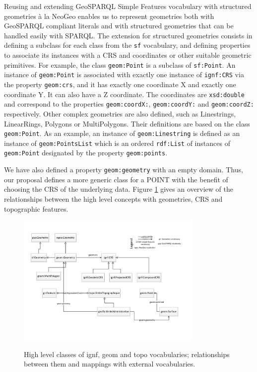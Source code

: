 Reusing and extending GeoSPARQL Simple Features vocabulary with structured geometries  \`a la NeoGeo enables us to represent geometries both with GeoSPARQL compliant literals and with structured geometries that can be handled easily with SPARQL. The extension for structured geometries consists in defining a subclass for each class from the \texttt{sf} vocabulary, and defining properties to associate its instances with a CRS and coordinates or other suitable geometric primitives. For example, the class \texttt{geom:Point} is a subclass of \texttt{sf:Point}. An instance of \texttt{geom:Point} is associated with exactly one instance of \texttt{ignf:CRS} via the property \texttt{geom:crs}, and it
has exactly one coordinate X and exactly one coordinate Y. It can also have a Z coordinate. The coordinates are \texttt{xsd:double} and correspond to the properties \texttt{geom:coordX:}, \texttt{geom:coordY:} and \texttt{geom:coordZ:} respectively. Other complex geometries are also defined, such as Linestrings, LinearRings, Polygons or MultiPolygons. Their definitions are based on the class \texttt{geom:Point}. As an example, an instance of \texttt{geom:Linestring} is defined as an instance of \texttt{geom:PointsList} which is an ordered \texttt{rdf:List} of instances of \texttt{geom:Point} designated by the property \texttt{geom:points}.


We have also defined a property \texttt{geom:geometry} with an empty domain. Thus, our proposal defines a more generic class for a \textsf{POINT} with the benefit of choosing the CRS of the underlying data. Figure \ref{fig:geomcrs} gives an overview of the relationships between the high level concepts with geometries, CRS and topographic features.

\begin{figure}[!htbp]
\vspace{-13pt}
  \begin{center}
  \includegraphics[width=0.8\textwidth]{img/vocabs-ign.pdf}
  \vspace{-15pt}
  \caption{High level classes of ignf, geom and topo vocabularies; relationships between them and mappings with external vocabularies.}
  \vspace{-10pt}
  \label{fig:geomcrs}
  \end{center}
\end{figure}

